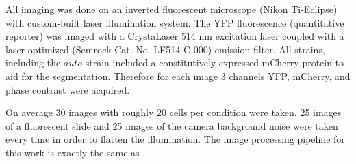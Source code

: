 All imaging was done on an inverted fluorescent microscope (Nikon Ti-Eclipse)
with custom-built laser illumination system. The YFP fluorescence (quantitative
reporter) was imaged with a CrystaLaser 514 nm excitation laser coupled with a
laser-optimized (Semrock Cat. No. LF514-C-000) emission filter. All strains,
including the $auto$ strain included a constitutively expressed mCherry protein
to aid for the segmentation. Therefore for each image 3 channels YFP, mCherry,
and phase contrast were acquired.

On average 30 images with roughly 20 cells per condition were taken. 25 images
of a fluorescent slide and 25 images of the camera background noise were taken
every time in order to flatten the illumination. The image  processing pipeline
for this work is exactly the same as \cite{Razo-Mejia2018}.
